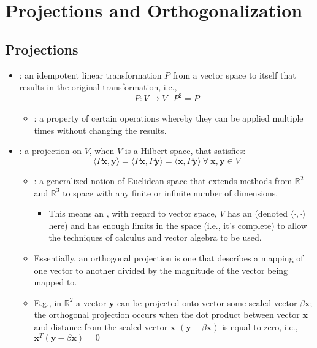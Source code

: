 \chapter{Projections and Orthogonalization}\label{Projections and Orthogonalization}

\section{Projections}\label{Projections}
\begin{itemize}
  \item {}: an idempotent linear transformation \(P\) from a vector space to itself that results in the original transformation, i.e., 
  \[%
  P : V \to V ~|~ P^2 = P
  \]%
    \begin{itemize}
      \item {}: a property of certain operations whereby they can be applied multiple times without changing the results.
    \end{itemize}
  \item {}: a projection on \(V\), when \(V\) is a Hilbert space, that satisfies:
  \[%
  \langle P \bm{x}, \bm{y} \rangle = 
  \langle P \bm{x}, P\bm{y} \rangle =
  \langle \bm{x}, P\bm{y} \rangle~\forall~\bm{x,y} \in V
  \]%
  
    \begin{itemize}
      \item {}: a generalized notion of Euclidean space that extends methods from \(\mathbb{R}^2\) and \(\mathbb{R}^3\) to space with any finite or infinite number of dimensions.
        \begin{itemize}
          \item This means an \hyperref[Vector Length]{}, with regard to vector space,  \(V\) has an \hyperref[The Dot Product]{} (denoted \(\langle \cdot, \cdot \rangle \) here) and has enough limits in the space (i.e., it's complete) to allow the techniques of calculus and vector algebra to be used.
        \end{itemize}
      \item Essentially, an orthogonal projection is one that describes a mapping of one vector to another divided by the magnitude of the vector being mapped to.
      \item E.g., in \(\mathbb{R}^2\) a vector \(\bm{y}\) can be projected onto vector some scaled vector \(\beta\bm{x}\); the orthogonal projection occurs when the dot product between vector \(\bm{x}\) and distance  from the scaled vector \(\bm{x}\) \((\bm{y}-\beta\bm{x}) \) is equal to zero, i.e.,
      \(%
      \bm{x}^T(\bm{y}-\beta\bm{x}) = 0
      \)%
      

\end{itemize}
\end{itemize}
